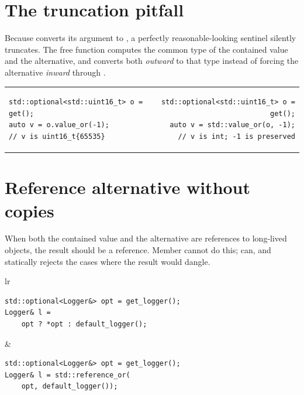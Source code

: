 \documentclass[a4paper,10pt,oneside,openany,final,article]{memoir}
\begin{document}
\section{The  truncation pitfall}

Because  converts its argument to
, a perfectly reasonable-looking sentinel silently truncates. The
free function computes the common type of the contained value and the
alternative, and converts both \emph{outward} to that type instead of
forcing the alternative \emph{inward} through .

\begin{tabular}{ lr }
  \begin{minipage}[t]{0.45\columnwidth}
    \begin{verbatim}
std::optional<std::uint16_t> o = get();
auto v = o.value_or(-1);
// v is uint16_t{65535}
    \end{verbatim}
  \end{minipage}
  &
    \begin{minipage}[t]{0.45\columnwidth}
      \begin{verbatim}
std::optional<std::uint16_t> o = get();
auto v = std::value_or(o, -1);
// v is int; -1 is preserved
      \end{verbatim}
    \end{minipage}
\end{tabular}

\section{Reference alternative without copies}

When both the contained value and the alternative are references to
long-lived objects, the result should be a reference. Member
 cannot do this;  can, and statically
rejects the cases where the result would dangle.

\begin{tabular}{ lr }
  \begin{minipage}[t]{0.45\columnwidth}
    \begin{verbatim}
std::optional<Logger&> opt = get_logger();
Logger& l =
    opt ? *opt : default_logger();
    \end{verbatim}
  \end{minipage}
  &
    \begin{minipage}[t]{0.45\columnwidth}
      \begin{verbatim}
std::optional<Logger&> opt = get_logger();
Logger& l = std::reference_or(
    opt, default_logger());
      \end{verbatim}
    \end{minipage}
\end{tabular}
\end{document}
